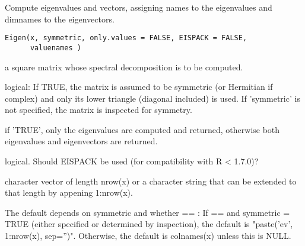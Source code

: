 \begin{Description}\relax
Compute eigenvalues and vectors, assigning names to the eigenvalues
and dimnames to the eigenvectors.
\end{Description}
\begin{Usage}
\begin{verbatim}
Eigen(x, symmetric, only.values = FALSE, EISPACK = FALSE,
      valuenames )
\end{verbatim}
\end{Usage}
\begin{Arguments}
\begin{ldescription}
\item[\code{x}] a square matrix whose spectral decomposition is to be computed.  

\item[\code{symmetric}] logical:  If TRUE, the matrix is assumed to be symmetric (or 
Hermitian if complex) and only its lower triangle (diagonal
included) is used.  If 'symmetric' is not specified, the
matrix is inspected for symmetry.

\item[\code{only.values}] if 'TRUE', only the eigenvalues are computed and returned, otherwise
both eigenvalues and eigenvectors are returned. 

\item[\code{EISPACK}] logical. Should EISPACK be used (for compatibility with R < 1.7.0)?

\item[\code{valuenames}] character vector of length nrow(x) or a character string that can be
extended to that length by appening 1:nrow(x).

The default depends on symmetric and whether
 == :  If
 ==  and
symmetric = TRUE (either specified or determined by
inspection), the default is "paste('ev', 1:nrow(x), sep='')".
Otherwise, the default is colnames(x) unless this is NULL. 

\end{ldescription}
\end{Arguments}
